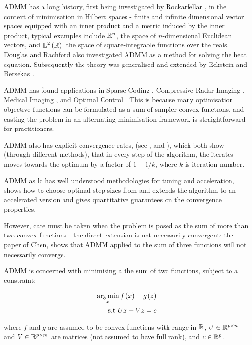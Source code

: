 ADMM has a long history, first being investigated by Rockarfellar \cite{rockafellar1976monotone}, in the context of minimisation in Hilbert spaces - finite and infinite dimensional vector spaces equipped with an inner product and a metric induced by the inner product, typical examples include \({\mathbb{R}}^n\), the space of \(n\)-dimensional Euclidean vectors, and \(\mathbb{L}^2\left({\mathbb{R}}\right)\), the space of square-integrable functions over the reals. Douglas and Rachford \cite{douglas1956numerical} also investigated ADMM as a method for solving the heat equation. Subsequently the theory was generalised and extended by Eckstein and Bersekas \cite{eckstein1992douglas}.

ADMM has found applications in Sparse Coding \cite{Bristow2014}, Compressive Radar Imaging \cite{heredia2015consensus}, Medical Imaging \cite{sawatzky2014proximal}, and Optimal Control \cite{o2013splitting}. This is because many optimisation objective functions can be formulated as a sum of simpler convex functions, and casting the problem in an alternating minimisation framework is straightforward for practitioners.

ADMM also has explicit convergence rates, 
(see \cite{Shi2013}, and \cite{nishihara2015general}), which both show (through different methods), that in every step of the algorithm, the iterates moves towards the optimum by a factor of \(1-1/k\), where \(k\) is iteration number.

ADMM as lo has well understood methodologies for tuning and acceleration, \cite{ghadimi2015optimal} shows how to choose optimal step-sizes from  and \cite{goldstein2014fast} extends the algorithm to an accelerated version and gives quantitative guarantees on the convergence properties. 

However, care must be taken when the problem is posed as the sum of more than two convex functions - the direct extension is not necessarily convergent: the paper of Chen\cite{chen2016direct}, shows that ADMM applied to the sum of three functions will not necessarily converge.

ADMM is concerned with minimising a the sum of two functions, subject to a constraint:

\begin{align}
\operatorname*{arg\,min}_{x} f\left( x \right) + g\left(z\right) \nonumber
\\
\text{s.t } Ux + Vz = c
\label{admm}
\end{align}

where \(f\) and \(g\) are assumed to be convex functions with range in \({\mathbb{R}}\), \(U \in {\mathbb{R}}^{p \times n}\) and \(V\in {\mathbb{R}}^{p \times m}\) are matrices (not assumed to have full rank), and \(c \in {\mathbb{R}}^p\).

